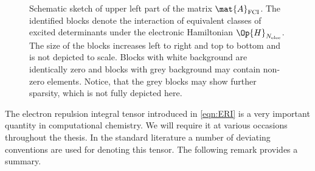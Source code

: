 \begin{figure}
	\centering
	\caption[Schematic sketch of the he \FCI matrix]{
		Schematic sketch of upper left part of the \FCI matrix $\mat{A}_\text{FCI}$.
		The identified blocks denote the
		interaction of equivalent classes of excited determinants
		under the electronic Hamiltonian $\Op{H}_{\Nelec}$.
		The size of the blocks increases left to right and top to bottom
		and is not depicted to scale.
		Blocks with white background are identically zero
		and blocks with grey background may contain non-zero elements.
		Notice, that the grey blocks may show further
		sparsity, which is not fully depicted here.
	}
	\label{fig:StructureFCIMatrix}
\end{figure}

The electron repulsion integral tensor introduced in \eqref{eqn:ERI}
is a very important quantity in computational chemistry.
We will require it at various occasions throughout the thesis.
In the standard literature a number of deviating conventions are used
for denoting this tensor. The following remark provides a summary.

